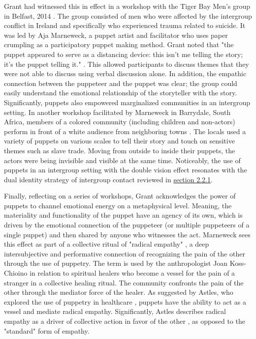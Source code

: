 \documentclass[dissertation,math,vertlayout,pdfa,colorlinks,nologo]{aaltoseries}
\begin{document}
Grant had witnessed this in effect in a workshop with the Tiger Bay Men's group in Belfast, 2014 \cite[p. 5]{grantObjectsObjectivesApplied2020}. The group consisted of men who were affected by the intergroup conflict in Ireland and specifically who experienced trauma related to suicide. It was led by Aja Marneweck, a puppet artist and facilitator who uses paper crumpling as a participatory puppet making method. Grant noted that "the puppet appeared to serve as a distancing device: this isn’t me telling the story; it’s the puppet telling it." \cite[p. 5]{grantObjectsObjectivesApplied2020}. This allowed participants to discuss themes that they were not able to discuss using verbal discussion alone. In addition, the empathic connection between the puppeteer and the puppet was clear; the group could easily understand the emotional relationship of the storyteller with the story. Significantly, puppets also empowered marginalized communities in an intergroup setting. In another workshop facilitated by Marneweck in Barrydale, South Africa, members of a colored community (including children and non-actors) perform in front of a white audience from neighboring towns \cite[p. 6]{grantObjectsObjectivesApplied2020}. The locals used a variety of puppets on various scales to tell their story and touch on sensitive themes such as slave trade. Moving from outside to inside their puppets, the actors were being invisible and visible at the same time. Noticeably, the use of puppets in an intergroup setting with the double vision effect resonates with the dual identity strategy of intergroup contact reviewed in \hyperref[sec:dual_identity]{section 2.2.1}. 

Finally, reflecting on a series of workshops, Grant acknowledges the power of puppets to channel emotional energy on a metaphysical level. Meaning, the materiality and functionality of the puppet have an agency of its own, which is driven by the emotional connection of the puppeteer (or multiple puppeteers of a single puppet) and then shared by anyone who witnesses the act. Marneweck sees this effect as part of a collective ritual of "radical empathy" \cite{marneweck2016a}, a deep intersubjective and performative connection of recognizing the pain of the other through the use of puppetry. The term is used by the anthropologist Joan Koss-Chioino \cite{koss-chioinoSpiritualTransformationRelation2006} in relation to spiritual healers who become a vessel for the pain of a stranger in a collective healing ritual. The community confronts the pain of the other through the mediator force of the healer. As suggested by Astles, who explored the use of puppetry in healthcare \cite{astlesWalkWalkMy2020}, puppets have the ability to act as a vessel and mediate radical empathy. Significantly, Astles describes radical empathy as a driver of collective action in favor of the other \cite{astlesWalkWalkMy2020}, as opposed to the "standard" form of empathy. 
\end{document}
